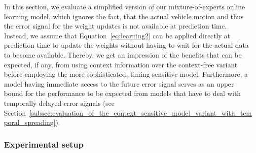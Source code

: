 In this section, we evaluate a simplified version of our mixture-of-experts online learning model, which ignores the fact, that the actual vehicle motion and thus the error signal for the weight updates is not available at prediction time.
Instead, we assume that Equation~\eqref{eq:learning2} can be applied directly at prediction time to update the weights without having to wait for the actual data to become available.
Thereby, we get an impression of the benefits that can be expected, if any, from using context information over the context-free variant before employing the more sophisticated, timing-sensitive model.
Furthermore, a model having immediate access to the future error signal serves as an upper bound for the performance to be expected from models that have to deal with temporally delayed error signals (see Section~\ref{subsec:evaluation_of_the_context_sensitive_model_variant_with_temporal_spreading}). 

\subsubsection{Experimental setup}%
\label{ssubsec:experimental_setup}

